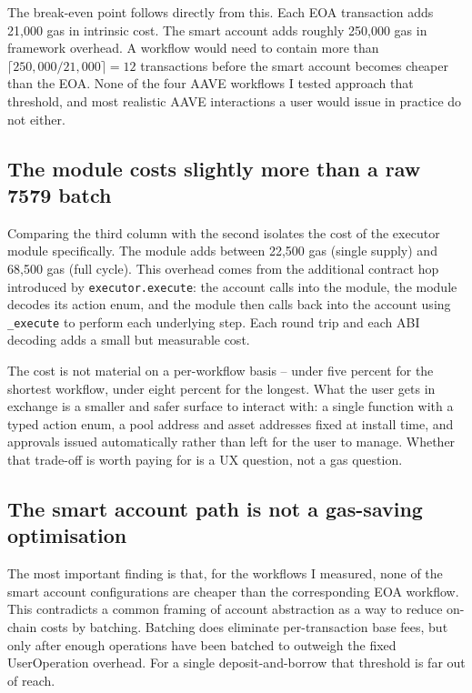 The break-even point follows directly from this. Each EOA transaction adds
21{,}000 gas in intrinsic cost. The smart account adds roughly 250{,}000 gas
in framework overhead. A workflow would need to contain more than
$\lceil 250{,}000 / 21{,}000 \rceil = 12$ transactions before the smart
account becomes cheaper than the EOA. None of the four AAVE workflows I
tested approach that threshold, and most realistic AAVE interactions a user
would issue in practice do not either.

\subsection{The module costs slightly more than a raw 7579 batch}

Comparing the third column with the second isolates the cost of the executor
module specifically. The module adds between 22{,}500 gas (single supply) and
68{,}500 gas (full cycle). This overhead comes from the additional contract
hop introduced by \texttt{executor.execute}: the account calls into the
module, the module decodes its action enum, and the module then calls back
into the account using \texttt{\_execute} to perform each underlying step.
Each round trip and each ABI decoding adds a small but measurable cost.

The cost is not material on a per-workflow basis -- under five percent for
the shortest workflow, under eight percent for the longest. What the user
gets in exchange is a smaller and safer surface to interact with: a single
function with a typed action enum, a pool address and asset addresses fixed
at install time, and approvals issued automatically rather than left for the
user to manage. Whether that trade-off is worth paying for is a UX question,
not a gas question.

\subsection{The smart account path is not a gas-saving optimisation}

The most important finding is that, for the workflows I measured, none of
the smart account configurations are cheaper than the corresponding EOA
workflow. This contradicts a common framing of account abstraction as a way
to reduce on-chain costs by batching. Batching does eliminate
per-transaction base fees, but only after enough operations have been
batched to outweigh the fixed UserOperation overhead. For a single
deposit-and-borrow that threshold is far out of reach.

